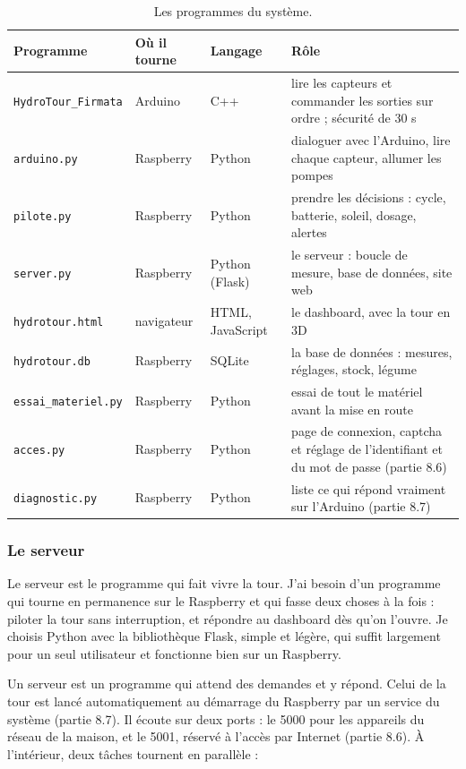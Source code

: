 \begin{table}[H]
\centering
\small
\begin{tabularx}{\textwidth}{|l|l|l|Y|}
\hline
\textbf{Programme} & \textbf{Où il tourne} & \textbf{Langage} & \textbf{Rôle} \\
\hline
\texttt{HydroTour\_Firmata} & Arduino & C++ & lire les capteurs et commander les sorties sur ordre ; sécurité de 30 s \\
\hline
\texttt{arduino.py} & Raspberry & Python & dialoguer avec l'Arduino, lire chaque capteur, allumer les pompes \\
\hline
\texttt{pilote.py} & Raspberry & Python & prendre les décisions : cycle, batterie, soleil, dosage, alertes \\
\hline
\texttt{server.py} & Raspberry & Python (Flask) & le serveur : boucle de mesure, base de données, site web \\
\hline
\texttt{hydrotour.html} & navigateur & HTML, JavaScript & le dashboard, avec la tour en 3D \\
\hline
\texttt{hydrotour.db} & Raspberry & SQLite & la base de données : mesures, réglages, stock, légume \\
\hline
\texttt{essai\_materiel.py} & Raspberry & Python & essai de tout le matériel avant la mise en route \\
\hline
\texttt{acces.py} & Raspberry & Python & page de connexion, captcha et réglage de l'identifiant et du mot de passe (partie 8.6) \\
\hline
\texttt{diagnostic.py} & Raspberry & Python & liste ce qui répond vraiment sur l'Arduino (partie 8.7) \\
\hline
\end{tabularx}
\caption{Les programmes du système.}
\end{table}

\subsubsection*{Le serveur}

Le serveur est le programme qui fait vivre la tour. J'ai besoin d'un programme qui tourne en permanence sur le Raspberry et qui fasse deux choses à la fois : piloter la tour sans interruption, et répondre au dashboard dès qu'on l'ouvre. Je choisis Python avec la bibliothèque Flask, simple et légère, qui suffit largement pour un seul utilisateur et fonctionne bien sur un Raspberry.

Un serveur est un programme qui attend des demandes et y répond. Celui de la tour est lancé automatiquement au démarrage du Raspberry par un service du système (partie 8.7). Il écoute sur deux ports : le 5000 pour les appareils du réseau de la maison, et le 5001, réservé à l'accès par Internet (partie 8.6). À l'intérieur, deux tâches tournent en parallèle :

